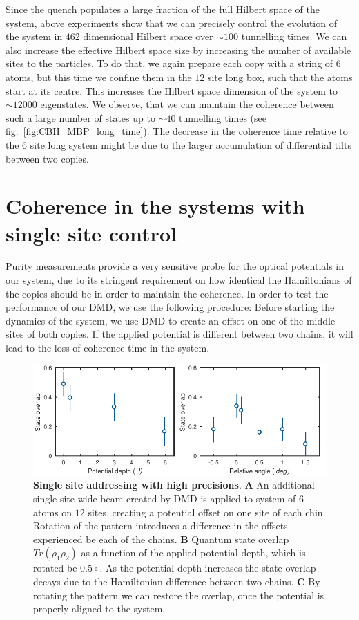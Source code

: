 Since the quench populates a large fraction of the full Hilbert space of the system, above experiments show that we can precisely control the evolution of the system in $462$ dimensional Hilbert space over $\sim 100$ tunnelling times. We can also increase the effective Hilbert space size by increasing the number of available sites to the particles. To do that, we again prepare each copy with a string of $6$ atoms, but this time we confine them in the $12$ site long box, such that the atoms start at its centre. This increases the Hilbert space dimension of the system to $\sim 12 000$ eigenstates. We observe, that we can maintain the coherence between such a large number of states up to $\sim 40$ tunnelling times (see fig.~\ref{fig:CBH_MBP_long_time}). The decrease in the coherence time relative to the $6$ site long system might be due to the larger accumulation of differential tilts between two copies.  

\section{Coherence in the systems with single site control} 
Purity measurements provide a very sensitive probe for the optical potentials in our system, due to its stringent requirement on how identical the Hamiltonians of the copies should be in order to maintain the coherence. In order to test the performance of our DMD, we use the following procedure: Before starting the dynamics of the system, we use DMD to create an offset on one of the middle sites of both copies. If the applied potential is different between two chains, it will lead to the loss of coherence time in the system.

\begin{figure}[t]
	\centering
	\includegraphics[scale=1]{figures/CBH_pattern_rotation.pdf}
	\caption{{\bf Single site addressing with high precisions}. {\bf A} An additional single-site wide beam created by DMD is applied to system of $6$ atoms on $12$ sites, creating a potential offset on one site of each chin. Rotation of the pattern introduces a difference in the offsets experienced be each of the chains. {\bf B} Quantum state overlap $Tr(\rho_1 \rho_2) $ as a function of the applied potential depth, which is rotated be $0.5\circ$. As the potential depth increases the state overlap decays due to the Hamiltonian difference between two chains. {\bf C} By rotating the pattern we can restore the overlap, once the potential is properly aligned to the system.}
	\label{fig:CBH_pattern_rotation}
\end{figure}

